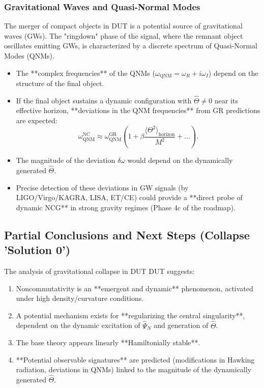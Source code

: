 \documentclass[11pt, a4paper]{article}
\theoremstyle{remark}
\newcommand{\Op}[1]{\hat{#1}}
\begin{document}
\subsubsection{Gravitational Waves and Quasi-Normal Modes}
\label{ssubsec:nc_gw_qnm}
The merger of compact objects in DUT is a potential source of gravitational waves (GWs). The "ringdown" phase of the signal, where the remnant object oscillates emitting GWs, is characterized by a discrete spectrum of Quasi-Normal Modes (QNMs).
\begin{itemize}
    \item The **complex frequencies** of the QNMs (\( \omega_{\text{QNM}} = \omega_R + i \omega_I \)) depend on the structure of the final object.
    \item If the final object sustains a dynamic configuration with \( \Op{\Theta} \neq 0 \) near its effective horizon, **deviations in the QNM frequencies** from GR predictions are expected:
      \[ \omega_{\text{QNM}}^{\text{NC}} \approx \omega_{\text{QNM}}^{\text{GR}} \left( 1 + \beta \frac{\langle \Theta^2 \rangle_{\text{horizon}}}{M^2} + \dots \right). \]
    \item The magnitude of the deviation \( \delta \omega \) would depend on the dynamically generated \( \Op{\Theta} \).
    \item Precise detection of these deviations in GW signals (by LIGO/Virgo/KAGRA, LISA, ET/CE) could provide a **direct probe of dynamic NCG** in strong gravity regimes (Phase 4c of the roadmap).
\end{itemize}

\subsection{Partial Conclusions and Next Steps (Collapse 'Solution 0')}
\label{subsec:collapse_conclusions_outlook}

The analysis of gravitational collapse in DUT DUT suggests:
\begin{enumerate}
    \item Noncommutativity is an **emergent and dynamic** phenomenon, activated under high density/curvature conditions.
    \item A potential mechanism exists for **regularizing the central singularity**, dependent on the dynamic excitation of \( \Op{\Psi}_N \) and generation of \( \Op{\Theta} \).
    \item The base theory appears linearly **Hamiltonially stable**.
    \item **Potential observable signatures** are predicted (modifications in Hawking radiation, deviations in QNMs) linked to the magnitude of the dynamically generated \( \Op{\Theta} \).
\end{enumerate}
\end{document}
